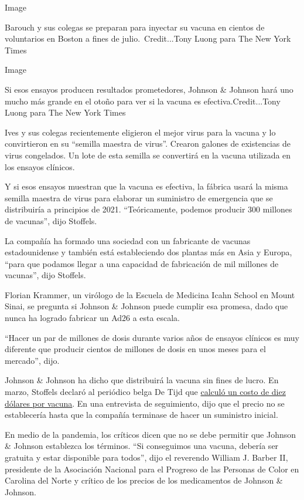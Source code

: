 Image

Barouch y sus colegas se preparan para inyectar su vacuna en cientos de
voluntarios en Boston a fines de julio.~Credit...Tony Luong para The New
York Times

Image

Si esos ensayos producen resultados prometedores, Johnson \& Johnson
hará uno mucho más grande en el otoño para ver si la vacuna es
efectiva.Credit...Tony Luong para The New York Times

Ives y sus colegas recientemente eligieron el mejor virus para la vacuna
y lo convirtieron en su ``semilla maestra de virus''. Crearon galones de
existencias de virus congelados. Un lote de esta semilla se convertirá
en la vacuna utilizada en los ensayos clínicos.

Y si esos ensayos muestran que la vacuna es efectiva, la fábrica usará
la misma semilla maestra de virus para elaborar un suministro de
emergencia que se distribuiría a principios de 2021. ``Teóricamente,
podemos producir 300 millones de vacunas'', dijo Stoffels.

La compañía ha formado una sociedad con un fabricante de vacunas
estadounidense y también está estableciendo dos plantas más en Asia y
Europa, ``para que podamos llegar a una capacidad de fabricación de mil
millones de vacunas'', dijo Stoffels.

Florian Krammer, un virólogo de la Escuela de Medicina Icahn School en
Mount Sinai, se pregunta si Johnson \& Johnson puede cumplir esa
promesa, dado que nunca ha logrado fabricar un Ad26 a esta escala.

``Hacer un par de millones de dosis durante varios años de ensayos
clínicos es muy diferente que producir cientos de millones de dosis en
unos meses para el mercado'', dijo.

Johnson \& Johnson ha dicho que distribuirá la vacuna sin fines de
lucro. En marzo, Stoffels declaró al periódico belga De Tijd que
\href{https://www.tijd.be/ondernemen/farma-biotech/we-rekenen-op-een-vaccin-van-10-euro-tegen-coronavirus/10217795.html}{calculó
un costo de diez dólares por vacuna}. En una entrevista de seguimiento,
dijo que el precio no se establecería hasta que la compañía terminase de
hacer un suministro inicial.

En medio de la pandemia, los críticos dicen que no se debe permitir que
Johnson \& Johnson establezca los términos. ``Si conseguimos una vacuna,
debería ser gratuita y estar disponible para todos'', dijo el reverendo
William J. Barber II, presidente de la Asociación Nacional para el
Progreso de las Personas de Color en Carolina del Norte y crítico de los
precios de los medicamentos de Johnson \& Johnson.

